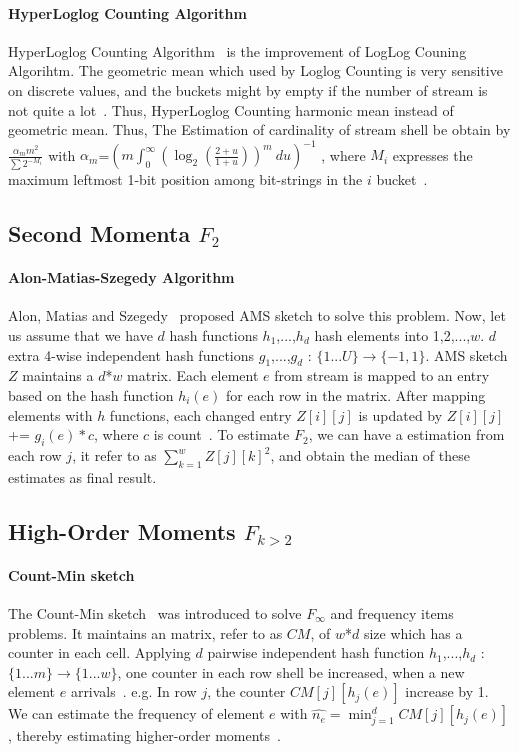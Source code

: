 \paragraph{HyperLoglog Counting Algorithm}

HyperLoglog Counting Algorithm~\cite{flajolet2007hyperloglog} is the improvement
of LogLog Couning Algorihtm. The geometric mean which used by Loglog Counting is
very sensitive on discrete values, and the buckets might by empty if the number
of stream is not quite a lot~\cite{flajolet2007hyperloglog}. Thus, HyperLoglog
Counting harmonic mean instead of geometric mean. Thus, The Estimation of
cardinality of stream shell be obtain by $\frac{\alpha_m m^2 }{\sum 2^{-M_i}}$
with $\alpha_m$=$(m \int_0^\infty(\log_2(\frac{2+u}{1+u}))^m\ du)^{-1}$ , where
$M_i$ expresses the maximum leftmost 1-bit position among bit-strings in the $i$
bucket~\cite{flajolet2007hyperloglog}.

\subsection{Second Momenta $F_2$}
\paragraph{Alon-Matias-Szegedy Algorithm}
Alon, Matias and Szegedy~\cite{alon1999space} proposed AMS sketch to solve this
problem. Now, let us assume that we have $d$ hash functions $h_1$,...,$h_d$ hash
elements into {1,2,...,$w$}. $d$ extra 4-wise independent hash functions
$g_1$,...,$g_d$ : $\{1...U\}\rightarrow \{-1,1\}$. AMS sketch $Z$ maintains a
$d$*$w$ matrix. Each element $e$ from stream is mapped to an entry based on the
hash function $h_i(e)$ for each row in the matrix. After mapping elements with
$h$ functions, each changed entry $Z[i][j]$ is updated by $Z[i][j]$ +=
$g_i(e)*c$, where $c$ is count~\cite{garofalakis2016data}. To estimate $F_2$, we
can have a estimation from each row $j$, it refer to as $\sum_{k=1}^w Z[j][k]^2$,
and obtain the median of these estimates as final result.

\subsection{High-Order Moments $F_{k>2}$}
\paragraph{Count-Min sketch}
The Count-Min sketch~\cite{cormode2005improved} was introduced to solve
$F_\infty$ and frequency items problems. It maintains an matrix, refer to as
$CM$, of $w$*$d$ size which has a counter in each cell. Applying $d$ pairwise
independent hash function $h_1$,...,$h_d$ : $\{1...m\} \rightarrow \{1...w\}$,
one counter in each row shell be increased, when a new element $e$ arrivals~\cite{garofalakis2016data}.
e.g. In row $j$, the counter $CM[j][h_j(e)]$ increase by 1. We can estimate the
frequency of element $e$ with $\hat{n_e} = \min_{j=1}^d CM[j][h_j(e)]$, thereby
estimating higher-order moments~\cite{cormode2005improved}.


